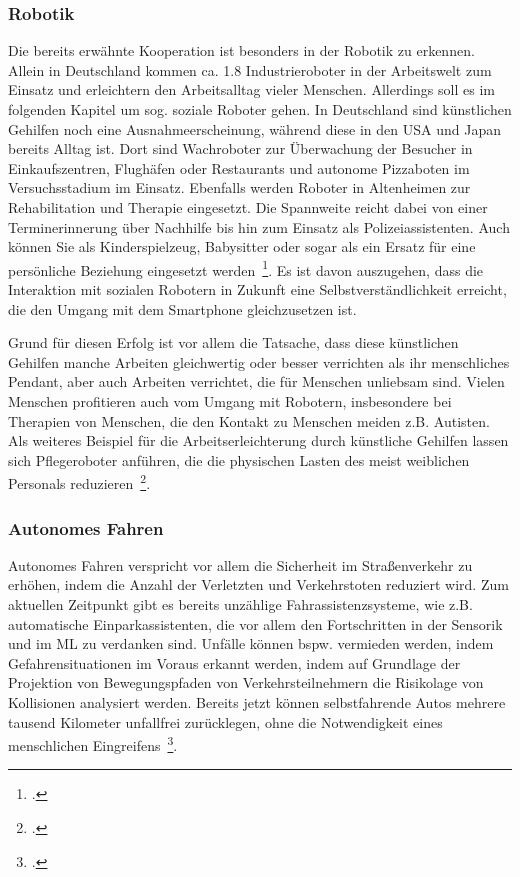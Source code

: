 \subsubsection{Robotik}
Die bereits erwähnte Kooperation ist besonders in der Robotik zu erkennen. Allein in Deutschland kommen ca. 1.8 Industrieroboter in der Arbeitswelt zum Einsatz und erleichtern
den Arbeitsalltag vieler Menschen. Allerdings soll es im folgenden Kapitel um sog. soziale Roboter gehen. In Deutschland sind künstlichen Gehilfen noch eine Ausnahmeerscheinung,
während diese in den USA und Japan bereits Alltag ist. Dort sind Wachroboter zur Überwachung der Besucher in Einkaufszentren, Flughäfen oder Restaurants und autonome Pizzaboten im Versuchsstadium im Einsatz. Ebenfalls werden Roboter in 
Altenheimen zur Rehabilitation und Therapie eingesetzt. Die Spannweite reicht dabei von einer Terminerinnerung über Nachhilfe bis hin zum Einsatz als Polizeiassistenten.
Auch können Sie als Kinderspielzeug, Babysitter oder sogar als ein Ersatz für eine persönliche Beziehung eingesetzt werden~\footcite[\vglf][]{Heinrichs.2022}.
Es ist davon auszugehen, dass die Interaktion mit sozialen Robotern in Zukunft eine Selbstverständlichkeit erreicht, die den Umgang mit dem Smartphone gleichzusetzen ist.

Grund für diesen Erfolg ist vor allem die Tatsache, dass diese künstlichen Gehilfen manche Arbeiten gleichwertig oder besser verrichten als ihr menschliches Pendant, aber auch
Arbeiten verrichtet, die für Menschen unliebsam sind. 
Vielen Menschen profitieren auch vom Umgang mit Robotern, insbesondere bei Therapien von Menschen, die den Kontakt zu Menschen meiden z.B. Autisten. Als weiteres Beispiel für die Arbeitserleichterung durch künstliche Gehilfen lassen sich 
Pflegeroboter anführen, die die physischen Lasten des meist weiblichen Personals reduzieren~\footcite[\vglf][]{Heinrichs.2022}.

\subsubsection{Autonomes Fahren}
Autonomes Fahren verspricht vor allem die Sicherheit im Straßenverkehr zu erhöhen, indem die Anzahl der Verletzten und Verkehrstoten reduziert wird. Zum aktuellen Zeitpunkt
gibt es bereits unzählige Fahrassistenzsysteme, wie z.B. automatische Einparkassistenten, die vor allem den Fortschritten in der Sensorik und im \ac{ML} zu verdanken sind.
Unfälle können bspw. vermieden werden, indem Gefahrensituationen im Voraus erkannt werden, indem auf Grundlage der Projektion von Bewegungspfaden von Verkehrsteilnehmern die Risikolage
von Kollisionen analysiert werden.
Bereits jetzt können selbstfahrende Autos mehrere tausend Kilometer unfallfrei zurücklegen, ohne die Notwendigkeit eines menschlichen Eingreifens~\footcite[\vglf][]{Scherk.2017}.

